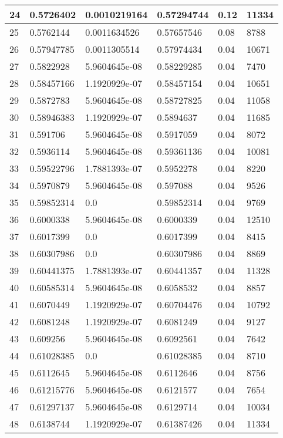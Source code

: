 \begin{longtable}{|l|l|l|l|l|l|}
24 & 0.5726402 & 0.0010219164 & 0.57294744 & 0.12 & 11334 \\ \hline 
25 & 0.5762144 & 0.0011634526 & 0.57657546 & 0.08 & 8788 \\ \hline 
26 & 0.57947785 & 0.0011305514 & 0.57974434 & 0.04 & 10671 \\ \hline 
27 & 0.5822928 & 5.9604645e-08 & 0.58229285 & 0.04 & 7470 \\ \hline 
28 & 0.58457166 & 1.1920929e-07 & 0.58457154 & 0.04 & 10651 \\ \hline 
29 & 0.5872783 & 5.9604645e-08 & 0.58727825 & 0.04 & 11058 \\ \hline 
30 & 0.58946383 & 1.1920929e-07 & 0.5894637 & 0.04 & 11685 \\ \hline 
31 & 0.591706 & 5.9604645e-08 & 0.5917059 & 0.04 & 8072 \\ \hline 
32 & 0.5936114 & 5.9604645e-08 & 0.59361136 & 0.04 & 10081 \\ \hline 
33 & 0.59522796 & 1.7881393e-07 & 0.5952278 & 0.04 & 8220 \\ \hline 
34 & 0.5970879 & 5.9604645e-08 & 0.597088 & 0.04 & 9526 \\ \hline 
35 & 0.59852314 & 0.0 & 0.59852314 & 0.04 & 9769 \\ \hline 
36 & 0.6000338 & 5.9604645e-08 & 0.6000339 & 0.04 & 12510 \\ \hline 
37 & 0.6017399 & 0.0 & 0.6017399 & 0.04 & 8415 \\ \hline 
38 & 0.60307986 & 0.0 & 0.60307986 & 0.04 & 8869 \\ \hline 
39 & 0.60441375 & 1.7881393e-07 & 0.60441357 & 0.04 & 11328 \\ \hline 
40 & 0.60585314 & 5.9604645e-08 & 0.6058532 & 0.04 & 8857 \\ \hline 
41 & 0.6070449 & 1.1920929e-07 & 0.60704476 & 0.04 & 10792 \\ \hline 
42 & 0.6081248 & 1.1920929e-07 & 0.6081249 & 0.04 & 9127 \\ \hline 
43 & 0.609256 & 5.9604645e-08 & 0.6092561 & 0.04 & 7642 \\ \hline 
44 & 0.61028385 & 0.0 & 0.61028385 & 0.04 & 8710 \\ \hline 
45 & 0.6112645 & 5.9604645e-08 & 0.6112646 & 0.04 & 8756 \\ \hline 
46 & 0.61215776 & 5.9604645e-08 & 0.6121577 & 0.04 & 7654 \\ \hline 
47 & 0.61297137 & 5.9604645e-08 & 0.6129714 & 0.04 & 10034 \\ \hline 
48 & 0.6138744 & 1.1920929e-07 & 0.61387426 & 0.04 & 11334 \\ \hline 

\end{longtable}
